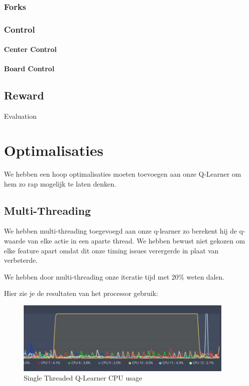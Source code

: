 \documentclass[a4paper,openany]{uantwerpenassignment}
\begin{document}
\subsection{Forks}
\subsection{Control}
\subsubsection{Center Control}
\subsubsection{Board Control}

\section{Reward}


Evaluation\cite{chessprogramming}

\chapter{Optimalisaties}

We hebben een hoop optimalisaties moeten toevoegen aan onze Q-Learner om hem zo rap mogelijk te laten denken.

\section{Multi-Threading}

We hebben multi-threading toegevoegd aan onze q-learner zo berekent hij de q-waarde van elke actie in een aparte thread. We hebben bewust niet gekozen om elke feature apart omdat dit onze timing issues verergerde in plaat van verbeterde.

We hebben door multi-threading onze iteratie tijd met 20\% weten dalen.

Hier zie je de resultaten van het processor gebruik:

\begin{figure}[h]
    \centering
    \includegraphics[width=300pt]{images/singlethreaded.png}
    \caption{Single Threaded Q-Learner CPU usage}
    \label{fig:singlethreaded}
\end{figure}
\end{document}
